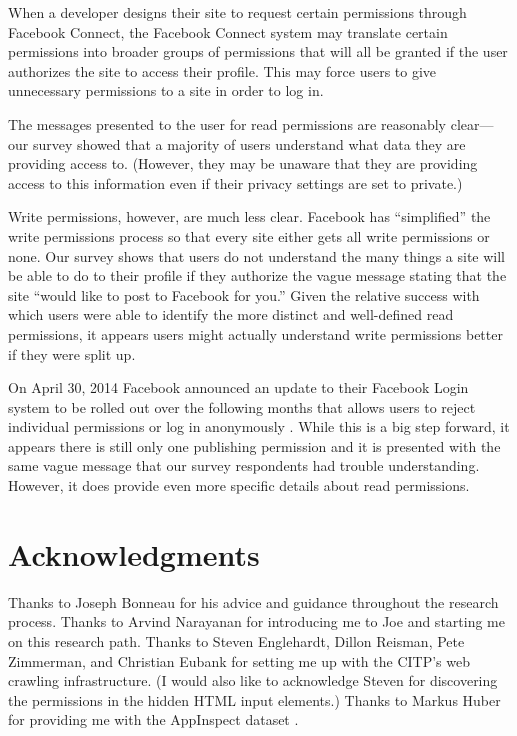 \documentclass[10pt]{sig-alternate-10pt}
\begin{document}
When a developer designs their site to request certain permissions through Facebook Connect, the Facebook Connect system may translate certain permissions into broader groups of permissions that will all be granted if the user authorizes the site to access their profile. This may force users to give unnecessary permissions to a site in order to log in. 

The messages presented to the user for read permissions are reasonably clear---our survey showed that a majority of users understand what data they are providing access to. (However, they may be unaware that they are providing access to this information even if their privacy settings are set to private.)

Write permissions, however, are much less clear. Facebook has ``simplified'' the write permissions process so that every site either gets all write permissions or none. Our survey shows that users do not understand the many things a site will be able to do to their profile if they authorize the vague message stating that the site ``would like to post to Facebook for you.'' Given the relative success with which users were able to identify the more distinct and well-defined read permissions, it appears users might actually understand write permissions better if they were split up.

On April 30, 2014 Facebook announced an update to their Facebook Login system to be rolled out over the following months that allows users to reject individual permissions or log in anonymously \cite{newlogin}. While this is a big step forward, it appears there is still only one publishing permission and it is presented with the same vague message that our survey respondents had trouble understanding. However, it does provide even more specific details about read permissions. 

\section*{Acknowledgments}

Thanks to Joseph Bonneau for his advice and guidance throughout the research process. Thanks to Arvind Narayanan for introducing me to Joe and starting me on this research path. Thanks to Steven Englehardt, Dillon Reisman, Pete Zimmerman, and Christian Eubank for setting me up with the CITP's web crawling infrastructure. (I would also like to acknowledge Steven for discovering the permissions in the hidden HTML input elements.) Thanks to Markus Huber for providing me with the AppInspect dataset \cite{appinspect}.
\end{document}
